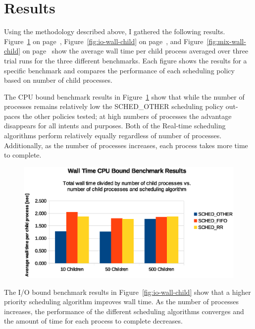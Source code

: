 ﻿\section{Results}

Using the methodology described above, I gathered the following results. Figure~\ref{fig:cpu-wall-child} on page~\pageref{fig:cpu-wall-child}, Figure~\ref{fig:io-wall-child} on page~\pageref{fig:io-wall-child}, and Figure~\ref{fig:mix-wall-child} on page~\pageref{fig:mix-wall-child} show the average wall time per child process averaged over three trial runs for the three different benchmarks.  Each figure shows the results for a specific benchmark and compares the performance of each scheduling policy based on number of child processes.

The CPU bound benchmark results in Figure~\ref{fig:cpu-wall-child} show that while the number of processes remains relatively low the SCHED\_OTHER scheduling policy out-paces the other policies tested; at high numbers of processes the advantage disappears for all intents and purposes.  Both of the Real-time scheduling algorithms perform relatively equally regardless of number of processes.  Additionally, as the number of processes increases, each process takes more time to complete.

\begin{figure}[hbtp]
  \centering
  \includegraphics[scale=0.8]{img/cpu-wall-child.eps}
  \caption{}
  \label{fig:cpu-wall-child}
\end{figure}

The I/O bound benchmark results in Figure~\ref{fig:io-wall-child} show that a higher priority scheduling algorithm improves wall time.  As the number of processes increases, the performance of the different scheduling algorithms converges and the amount of time for each process to complete decreases.

